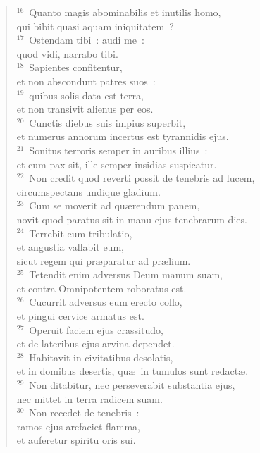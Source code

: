 \begin{flushleft}
\begin{verse}
${}^{16}$~Quanto magis abominabilis et inutilis homo,\\ qui bibit quasi aquam iniquitatem~?\\
${}^{17}$~Ostendam tibi~: audi me~:\\ quod vidi, narrabo tibi.\\
${}^{18}$~Sapientes confitentur,\\ et non abscondunt patres suos~:\\
${}^{19}$~quibus solis data est terra,\\ et non transivit alienus per eos.\\
${}^{20}$~Cunctis diebus suis impius superbit,\\ et numerus annorum incertus est tyrannidis ejus.\\
${}^{21}$~Sonitus terroris semper in auribus illius~:\\ et cum pax sit, ille semper insidias suspicatur.\\
${}^{22}$~Non credit quod reverti possit de tenebris ad lucem,\\ circumspectans undique gladium.\\
${}^{23}$~Cum se moverit ad qu\ae rendum panem,\\ novit quod paratus sit in manu ejus tenebrarum dies.\\
${}^{24}$~Terrebit eum tribulatio,\\ et angustia vallabit eum,\\ sicut regem qui pr\ae paratur ad pr\ae lium.\\
${}^{25}$~Tetendit enim adversus Deum manum suam,\\ et contra Omnipotentem roboratus est.\\
${}^{26}$~Cucurrit adversus eum erecto collo,\\ et pingui cervice armatus est.\\
${}^{27}$~Operuit faciem ejus crassitudo,\\ et de lateribus ejus arvina dependet.\\
${}^{28}$~Habitavit in civitatibus desolatis,\\ et in domibus desertis, qu\ae\ in tumulos sunt redact\ae .\\
${}^{29}$~Non ditabitur, nec perseverabit substantia ejus,\\ nec mittet in terra radicem suam.\\
${}^{30}$~Non recedet de tenebris~:\\ ramos ejus arefaciet flamma,\\ et auferetur spiritu oris sui.\\

\end{verse}
\end{flushleft}
